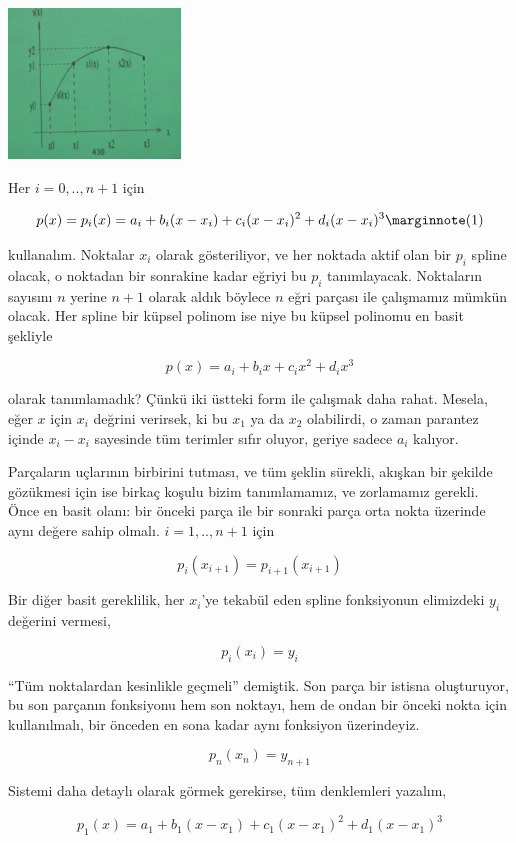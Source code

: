 \documentclass[12pt,fleqn]{article}\usepackage{../../common}
\begin{document}
\includegraphics[height=4cm]{spline1.png}

Her $i=0,..,n+1$ için 

$$ p(x) = p_i(x) = a_i + b_i(x-x_i) + c_i(x-x_i)^2 + d_i(x-x_i)^3
\mlabel{1}
$$

kullanalım. Noktalar $x_i$ olarak gösteriliyor, ve her noktada aktif olan
bir $p_i$ spline olacak, o noktadan bir sonrakine kadar eğriyi bu $p_i$
tanımlayacak. Noktaların sayısını $n$ yerine $n+1$ olarak aldık böylece $n$
eğri parçası ile çalışmamız mümkün olacak. Her spline bir küpsel polinom ise
niye bu küpsel polinomu en basit şekliyle

$$ p(x) = a_i + b_ix + c_ix^2 + d_ix^3 $$

olarak tanımlamadık? Çünkü iki üstteki form ile çalışmak daha
rahat. Mesela, eğer $x$ için $x_i$ değrini verirsek, ki bu $x_1$ ya da
$x_2$ olabilirdi, o zaman parantez içinde $x_i - x_i$ sayesinde tüm 
terimler sıfır oluyor, geriye sadece $a_i$ kalıyor. 

Parçaların uçlarının birbirini tutması, ve tüm şeklin sürekli, akışkan bir
şekilde gözükmesi için ise birkaç koşulu bizim tanımlamamız, ve zorlamamız
gerekli. Önce en basit olanı: bir önceki parça ile bir sonraki parça
orta nokta üzerinde aynı değere sahip olmalı. $i=1,..,n+1$ için

$$ p_i (x_{i+1}) = p_{i+1}(x_{i+1}) $$

Bir diğer basit gereklilik, her $x_i$'ye tekabül eden spline fonksiyonun
elimizdeki $y_i$ değerini vermesi,

$$ p_i(x_i) = y_i $$

``Tüm noktalardan kesinlikle geçmeli'' demiştik. Son parça bir istisna
oluşturuyor, bu son parçanın fonksiyonu hem son noktayı, hem de ondan bir
önceki nokta için kullanılmalı, bir önceden en sona kadar aynı fonksiyon
üzerindeyiz. 

$$ p_{n}(x_n) = y_{n+1} $$

Sistemi daha detaylı olarak görmek gerekirse, tüm denklemleri yazalım,

$$ p_1(x)  = a_1 + b_1(x-x_1) + c_1(x-x_1)^2 + d_1(x-x_1)^3$$
\end{document}
